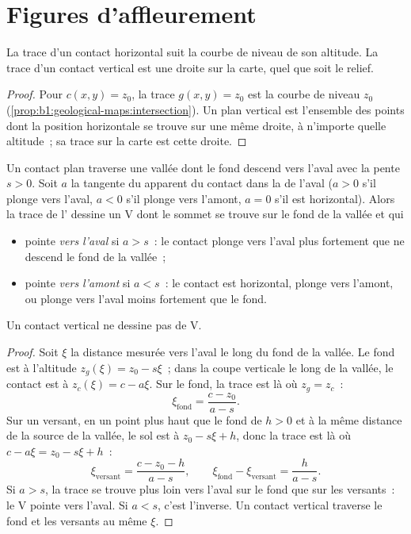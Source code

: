 \section{Figures d'affleurement}

\begin{proposition}\label{prop:b1:geological-maps:hv}
La trace d'un contact horizontal suit la courbe de niveau de son altitude. La
trace d'un contact vertical est une droite sur la carte, quel que soit le
relief.
\end{proposition}

\begin{proof}
Pour $c(x,y) = z_0$, la trace $g(x,y) = z_0$ est la courbe de niveau $z_0$
(\cref{prop:b1:geological-maps:intersection}). Un plan vertical est l'ensemble
des points dont la position horizontale se trouve sur une même droite, à
n'importe quelle altitude~; sa trace sur la carte est cette droite.
\end{proof}

\begin{theorem}\label{thm:b1:geological-maps:v-rule}
Un contact plan traverse une vallée dont le fond descend vers l'aval avec la
pente $s > 0$. Soit $a$ la tangente du  apparent du contact dans la
 de l'aval ($a > 0$ s'il plonge vers l'aval, $a < 0$ s'il plonge vers
l'amont, $a = 0$ s'il est horizontal). Alors la trace de l' dessine
un V dont le sommet se trouve sur le fond de la vallée et qui
\begin{itemize}
  \item pointe \emph{vers l'aval} si $a > s$~: le contact plonge vers l'aval
        plus fortement que ne descend le fond de la vallée~;
  \item pointe \emph{vers l'amont} si $a < s$~: le contact est horizontal,
        plonge vers l'amont, ou plonge vers l'aval moins fortement que le fond.
\end{itemize}
Un contact vertical ne dessine pas de V.
\end{theorem}

\begin{proof}
Soit $\xi$ la distance mesurée vers l'aval le long du fond de la vallée. Le
fond est à l'altitude $z_g(\xi) = z_0 - s\xi$~; dans la coupe verticale le long
de la vallée, le contact est à $z_c(\xi) = c - a\xi$. Sur le fond, la trace est
là où $z_g = z_c$~:
\[
  \xi_{\text{fond}} = \frac{c - z_0}{a - s}.
\]
Sur un versant, en un point plus haut que le fond de $h > 0$ et à la même
distance de la source de la vallée, le sol est à $z_0 - s\xi + h$, donc la trace
est là où $c - a\xi = z_0 - s\xi + h$~:
\[
  \xi_{\text{versant}} = \frac{c - z_0 - h}{a - s}, \qquad
  \xi_{\text{fond}} - \xi_{\text{versant}} = \frac{h}{a - s}.
\]
Si $a > s$, la trace se trouve plus loin vers l'aval sur le fond que sur les
versants~: le V pointe vers l'aval. Si $a < s$, c'est l'inverse. Un contact
vertical traverse le fond et les versants au même $\xi$.
\end{proof}

